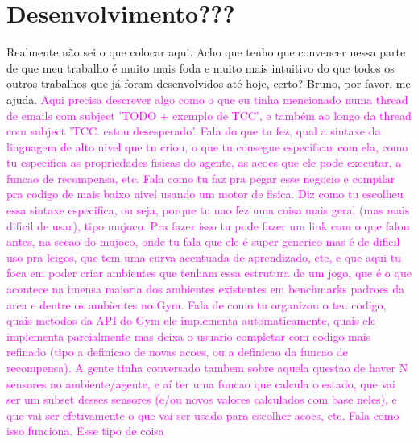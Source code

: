 \documentclass[cic,tc]{iiufrgs}
\newcommand\bruno[1]{\textcolor{magenta}{#1}}
\begin{document}
    \chapter{Desenvolvimento???}
    Realmente não sei o que colocar aqui. Acho que tenho que convencer nessa parte de que meu trabalho é muito mais foda e muito
    mais intuitivo do que todos os outros trabalhos que já foram desenvolvidos até hoje, certo?
    Bruno, por favor, me ajuda. 
    \bruno{Aqui precisa descrever algo como o que eu tinha mencionado numa thread de emails com subject 'TODO + exemplo de TCC', e também ao longo da thread com subject 'TCC. estou desesperado'. Fala do que tu fez, qual a sintaxe da linguagem de alto nivel que tu criou, o que tu consegue especificar com ela, como tu especifica as propriedades fisicas do agente, as acoes que ele pode executar, a funcao de recompensa, etc. Fala como tu faz pra pegar esse negocio e compilar pra codigo de mais baixo nivel usando um motor de fisica. Diz como tu escolheu essa sintaxe especifica, ou seja, porque tu nao fez uma coisa mais geral (mas mais dificil de usar), tipo mujoco. Pra fazer isso tu pode fazer um link com o que falou antes, na secao do mujoco, onde tu fala que ele é super generico mas é de dificil uso pra leigos, que tem uma curva acentuada de aprendizado, etc, e que aqui tu foca em poder criar ambientes que tenham essa estrutura de um jogo, que é o que acontece na imensa maioria dos ambientes existentes em benchmarks padroes da area e dentre os ambientes no Gym. Fala de como tu organizou o teu codigo, quais metodos da API do Gym ele implementa automaticamente, quais ele implementa parcialmente mas deixa o usuario completar com codigo mais refinado (tipo a definicao de novas acoes, ou a definicao da funcao de recompensa). A gente tinha conversado tambem sobre aquela questao de haver N sensores no ambiente/agente, e aí ter uma funcao que calcula o estado, que vai ser um subset desses sensores (e/ou novos valores calculados com base neles), e que vai ser efetivamente o que vai ser usado para escolher acoes, etc. Fala como isso funciona. Esse tipo de coisa}
    
\end{document}
